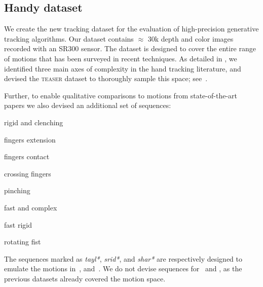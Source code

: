 
\subsection*{Handy dataset}
We create the new \handy{} tracking dataset for the evaluation of high-precision generative tracking algorithms. Our dataset contains $\approx$ 30k depth and color images recorded with an \realsense{} SR300 sensor. The dataset is designed to cover the entire range of motions that has been surveyed in recent techniques. As detailed in , we identified three main axes of complexity in the hand tracking literature, and devised the \textsc{teaser} dataset to thoroughly sample this space; see~\VideoSpace{}. 
% 
% 

Further, to enable qualitative comparisons to motions from state-of-the-art papers we also devised an additional set of sequences:
\begin{description}[labelsep=0em,labelwidth=1.6in,labelindent=1cm,itemsep=-.6em]
    \item[\VideoExtraTaylOne{} -- \textsc{tayl1}] rigid and clenching
    \item[\VideoExtraSridOne{} -- \textsc{srid1}] fingers extension 
    \item[\VideoExtraSridTwo{} -- \textsc{srid2}] fingers contact
    \item[\VideoExtraSridThree{} -- \textsc{srid3}] crossing fingers
    \item[\VideoExtraSridFour{} -- \textsc{srid4}] pinching
    \item[\VideoExtraSharOne{} -- \textsc{shar1}] fast and complex
    \item[\VideoExtraSharTwo{} -- \textsc{shar2}] fast rigid 
    \item[\VideoExtraSharThree{} -- \textsc{shar3}] rotating fist
\end{description}
The sequences marked as \emph{tayl*}, \emph{srid*}, and \emph{shar*} are respectively designed to emulate the motions in~\cite{taylor2016joint}, \cite{sridhar2015fast} and~\cite{sharp2015accurate}. We do not devise sequences for~\cite{qian2014realtime} and \cite{tompson2014real}, as the previous datasets already covered the motion space.

